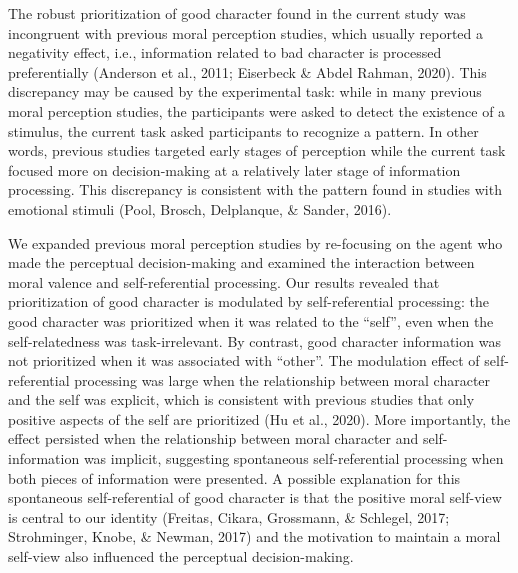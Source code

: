 \documentclass[
  man]{apa6}
\begin{document}
The robust prioritization of good character found in the current study was incongruent with previous moral perception studies, which usually reported a negativity effect, i.e., information related to bad character is processed preferentially (Anderson et al., 2011; Eiserbeck \& Abdel Rahman, 2020). This discrepancy may be caused by the experimental task: while in many previous moral perception studies, the participants were asked to detect the existence of a stimulus, the current task asked participants to recognize a pattern. In other words, previous studies targeted early stages of perception while the current task focused more on decision-making at a relatively later stage of information processing. This discrepancy is consistent with the pattern found in studies with emotional stimuli (Pool, Brosch, Delplanque, \& Sander, 2016).

We expanded previous moral perception studies by re-focusing on the agent who made the perceptual decision-making and examined the interaction between moral valence and self-referential processing. Our results revealed that prioritization of good character is modulated by self-referential processing: the good character was prioritized when it was related to the ``self'', even when the self-relatedness was task-irrelevant. By contrast, good character information was not prioritized when it was associated with ``other''. The modulation effect of self-referential processing was large when the relationship between moral character and the self was explicit, which is consistent with previous studies that only positive aspects of the self are prioritized (Hu et al., 2020). More importantly, the effect persisted when the relationship between moral character and self-information was implicit, suggesting spontaneous self-referential processing when both pieces of information were presented. A possible explanation for this spontaneous self-referential of good character is that the positive moral self-view is central to our identity (Freitas, Cikara, Grossmann, \& Schlegel, 2017; Strohminger, Knobe, \& Newman, 2017) and the motivation to maintain a moral self-view also influenced the perceptual decision-making.
\end{document}
